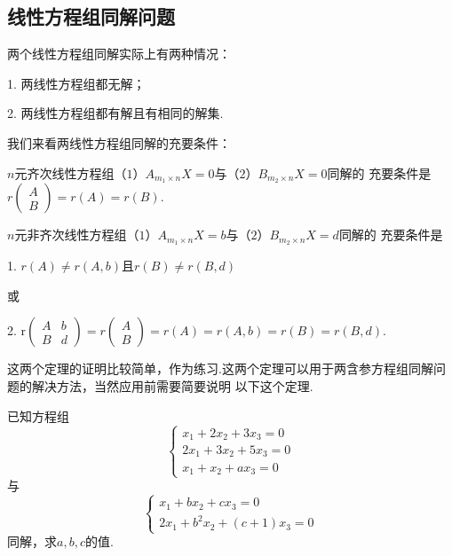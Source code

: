 \subsection{线性方程组同解问题}
两个线性方程组同解实际上有两种情况：

1. 两线性方程组都无解；

2. 两线性方程组都有解且有相同的解集.

我们来看两线性方程组同解的充要条件：
\begin{theorem}
	$n$元齐次线性方程组（$1$）$A_{m_1 \times n}X=0$与（$2$）$B_{m_2 \times n}X=0$同解的
	充要条件是$r\begin{pmatrix}
		A \\ B
	\end{pmatrix}=r(A)=r(B)$.
\end{theorem}
\begin{theorem}
	$n$元非齐次线性方程组（$1$）$A_{m_1 \times n}X=b$与（$2$）$B_{m_2 \times n}X=d$同解的
	充要条件是
	
	\textup{1. }$r(A)\neq r(A,b)$且$r(B)\neq r(B,d)$
	
	或
	
	\textup{2. }r$\begin{pmatrix}
		A & b \\ B & d
	\end{pmatrix}=r\begin{pmatrix}
		A \\ B
	\end{pmatrix}=r(A)=r(A,b)=r(B)=r(B,d)$.
\end{theorem}
这两个定理的证明比较简单，作为练习.这两个定理可以用于两含参方程组同解问题的解决方法，当然应用前需要简要说明
以下这个定理.
\begin{example}
	已知方程组$$\begin{cases}
		x_1+2x_2+3x_3=0 \\ 2x_1+3x_2+5x_3=0 \\ x_1+x_2+ax_3=0
	\end{cases}$$
	与$$\begin{cases}
		x_1+bx_2+cx_3=0 \\ 2x_1+b^2x_2+(c+1)x_3=0
	\end{cases}$$
	同解，求$a,b,c$的值.
\end{example}
